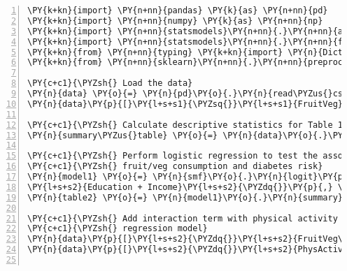 \documentclass[11pt]{article}
\begin{document}
\begin{Verbatim}[commandchars=\\\{\},numbers=left,firstnumber=1,stepnumber=1,formatcom=\footnotesize]
\PY{k+kn}{import} \PY{n+nn}{pandas} \PY{k}{as} \PY{n+nn}{pd}
\PY{k+kn}{import} \PY{n+nn}{numpy} \PY{k}{as} \PY{n+nn}{np}
\PY{k+kn}{import} \PY{n+nn}{statsmodels}\PY{n+nn}{.}\PY{n+nn}{api} \PY{k}{as} \PY{n+nn}{sm}
\PY{k+kn}{import} \PY{n+nn}{statsmodels}\PY{n+nn}{.}\PY{n+nn}{formula}\PY{n+nn}{.}\PY{n+nn}{api} \PY{k}{as} \PY{n+nn}{smf}
\PY{k+kn}{from} \PY{n+nn}{typing} \PY{k+kn}{import} \PY{n}{Dict}\PY{p}{,} \PY{n}{Any}
\PY{k+kn}{from} \PY{n+nn}{sklearn}\PY{n+nn}{.}\PY{n+nn}{preprocessing} \PY{k+kn}{import} \PY{n}{StandardScaler}

\PY{c+c1}{\PYZsh{} Load the data}
\PY{n}{data} \PY{o}{=} \PY{n}{pd}\PY{o}{.}\PY{n}{read\PYZus{}csv}\PY{p}{(}\PY{l+s+s2}{\PYZdq{}}\PY{l+s+s2}{diabetes\PYZus{}binary\PYZus{}health\PYZus{}indicators\PYZus{}BRFSS2015.csv}\PY{l+s+s2}{\PYZdq{}}\PY{p}{)}
\PY{n}{data}\PY{p}{[}\PY{l+s+s1}{\PYZsq{}}\PY{l+s+s1}{FruitVeg}\PY{l+s+s1}{\PYZsq{}}\PY{p}{]} \PY{o}{=} \PY{n}{data}\PY{p}{[}\PY{l+s+s1}{\PYZsq{}}\PY{l+s+s1}{Fruits}\PY{l+s+s1}{\PYZsq{}}\PY{p}{]} \PY{o}{\PYZam{}} \PY{n}{data}\PY{p}{[}\PY{l+s+s1}{\PYZsq{}}\PY{l+s+s1}{Veggies}\PY{l+s+s1}{\PYZsq{}}\PY{p}{]}

\PY{c+c1}{\PYZsh{} Calculate descriptive statistics for Table 1}
\PY{n}{summary\PYZus{}table} \PY{o}{=} \PY{n}{data}\PY{o}{.}\PY{n}{describe}\PY{p}{(}\PY{p}{)}

\PY{c+c1}{\PYZsh{} Perform logistic regression to test the association between}
\PY{c+c1}{\PYZsh{} fruit/veg consumption and diabetes risk}
\PY{n}{model1} \PY{o}{=} \PY{n}{smf}\PY{o}{.}\PY{n}{logit}\PY{p}{(}\PY{l+s+s2}{\PYZdq{}}\PY{l+s+s2}{Diabetes\PYZus{}binary \PYZti{} FruitVeg + Age + Sex + BMI + }\PY{l+s+se}{\PYZbs{}}
\PY{l+s+s2}{Education + Income}\PY{l+s+s2}{\PYZdq{}}\PY{p}{,} \PY{n}{data}\PY{o}{=}\PY{n}{data}\PY{p}{)}\PY{o}{.}\PY{n}{fit}\PY{p}{(}\PY{p}{)}
\PY{n}{table2} \PY{o}{=} \PY{n}{model1}\PY{o}{.}\PY{n}{summary}\PY{p}{(}\PY{p}{)}

\PY{c+c1}{\PYZsh{} Add interaction term with physical activity and fit the logistic}
\PY{c+c1}{\PYZsh{} regression model}
\PY{n}{data}\PY{p}{[}\PY{l+s+s2}{\PYZdq{}}\PY{l+s+s2}{FruitVeg\PYZus{}PhysActivity}\PY{l+s+s2}{\PYZdq{}}\PY{p}{]} \PY{o}{=} \PY{n}{data}\PY{p}{[}\PY{l+s+s2}{\PYZdq{}}\PY{l+s+s2}{FruitVeg}\PY{l+s+s2}{\PYZdq{}}\PY{p}{]} \PY{o}{*} \PYZbs{}
\PY{n}{data}\PY{p}{[}\PY{l+s+s2}{\PYZdq{}}\PY{l+s+s2}{PhysActivity}\PY{l+s+s2}{\PYZdq{}}\PY{p}{]}


\end{Verbatim}
\end{document}
